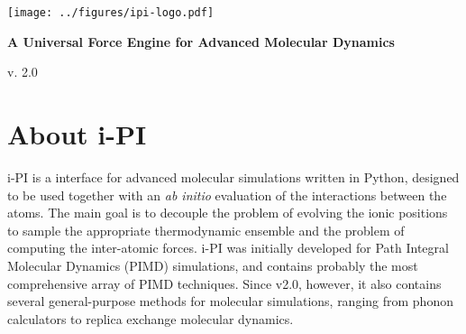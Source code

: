 \documentclass[11pt,english,fleqn]{report}
\begin{document}
\newcommand{\dd}{\; \mathrm{d}}
\newcommand{\Tr}{\mathrm{Tr}}
\newcommand{\bra}{< \! \!}
\newcommand{\ket}{\! \! >}
\newcommand{\betan}{\beta_N}
\newcommand{\logn}{\mathrm{ln}}
\newcommand{\expon}{\mathrm{exp}}
\newcommand{\Imag}{\mathrm{Im}}
\newcommand{\ipi}{{i-PI}\xspace}
\newcommand{\DFT}{Quantum Espresso, CP2K, CPMD and FHI-AIMS }
\newcommand{\empirical}{LAMMPS}

\begin{titlepage}

\begin{center}
\vspace*{2.5cm}

\par\end{center}

\begin{center}
\texttt{[image: ../figures/ipi-logo.pdf]}
\par\end{center}

\begin{center}
{\Large\bf A Universal Force Engine for Advanced Molecular Dynamics}
\par\end{center}

\begin{center}
{\large v. 2.0}
\par\end{center}

\end{titlepage}


\tableofcontents{}


\newpage{}


\chapter{About \ipi}

\label{intro}

\ipi is a interface for advanced molecular simulations written
in Python, designed to be used together with an \emph{ab initio} evaluation
of the interactions between the atoms. The main goal is to decouple
the problem of evolving the ionic positions to sample the appropriate
thermodynamic ensemble and the problem of computing the inter-atomic
forces. \ipi was initially developed for Path Integral Molecular Dynamics (PIMD)
simulations, and contains probably the most comprehensive array of PIMD
techniques. Since v2.0, however, it also contains several general-purpose
methods for molecular simulations, ranging from phonon calculators to
replica exchange molecular dynamics.
\end{document}

